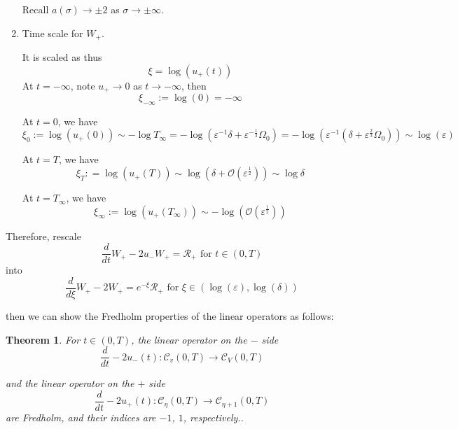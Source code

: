 \documentclass[letterpaper,11pt]{article}
\newcommand{\rmO}{\mathcal{O}}
\newcommand{\eps}{\varepsilon}
\numberwithin{equation}{section}
\theoremstyle{plain}
\newtheorem{theorem}{Theorem}[section]
\begin{document}
\begin{enumerate}
Recall $a(\sigma) \to \pm 2$ as $\sigma \to \pm \infty$.
\item Time scale for $W_+$.

It is scaled as thus
\[
\xi = \log(u_+(t))
\]
At $t = -\infty$, note $u_+ \to 0$ as $t \to -\infty$, then
\[
\xi_{-\infty} := \log(0) = -\infty
\]

At $t= 0 $, we have
\[
\xi_0 := \log(u_+(0)) \sim - \log T_\infty=-\log\left(\eps^{-1}\delta+\eps^{-\frac{1}{3}}\Omega_0\right) = -\log\left(\eps^{-1}(\delta+\eps^{\frac{2}{3}}\Omega_0)\right) \sim \log(\eps)
\]

At $t = T$, we have
\[
\xi_T : = \log(u_+(T)) \sim \log \left(\delta + \rmO(\eps^{\frac{1}{2}} ) \right) \sim \log \delta
\]

At $t = T_\infty$, we have 
\[
\xi_\infty := \log(u_+(T_\infty)) \sim -\log\left(\rmO(\eps^{\frac{1}{2}})\right)
\]
\end{enumerate}
Therefore, rescale 
\[
\frac{d}{dt}W_+ -2u_-W_+=\mathcal{R}_+ \text{ for }t \in (0,T)
\] 
into
\[
\frac{d}{d\xi} W_+ - 2W_+ = e^{-\xi} \mathcal{R}_+ \text{ for }\xi \in \left( \log(\eps) , \log(\delta) \right)
\]

then we can show the Fredholm properties of the linear operators as follows: 
\begin{theorem}
For $t \in (0,T)$, the linear operator on the $-$ side
\[
\frac{d}{dt} - 2u_-(t) : \mathcal{C}_v (0,T) \to \mathcal{C}_V (0,T)
\]

and the linear operator on the $+$ side
\[
\frac{d}{dt}  - 2u_+(t) : \mathcal{C}_\eta (0,T) \to \mathcal{C}_{\eta+1}(0,T)
\]
are Fredholm, and their indices are $-1$, $1$, respectively..
\end{theorem}
\end{document}
